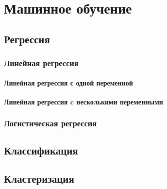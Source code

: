 \chapter{Машинное обучение}
\section{Регрессия}
\subsection{Линейная регрессия}
\subsubsection{Линейная регрессия с одной переменной}
\subsubsection{Линейная регрессия c несколькими переменными}
\subsection{Логистическая регрессия}
\section{Классификация}
\section{Кластеризация}
